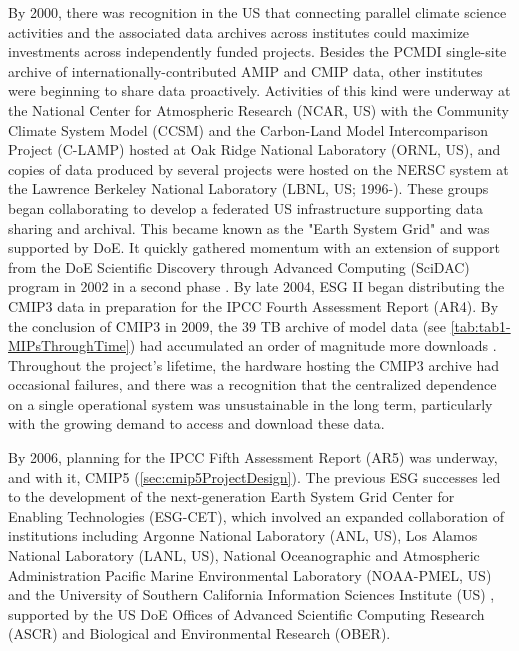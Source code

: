 \documentclass[manuscript]{copernicus}
\begin{document}
By 2000, there was recognition in the US that connecting parallel climate science activities and the associated data archives across institutes could maximize investments across independently funded projects. Besides the PCMDI single-site archive of internationally-contributed AMIP and CMIP data, other institutes were beginning to share data proactively. Activities of this kind were underway at the National Center for Atmospheric Research (NCAR, US) with the Community Climate System Model (CCSM) and the Carbon-Land Model Intercomparison Project (C-LAMP) hosted at Oak Ridge National Laboratory (ORNL, US), and copies of data produced by several projects were hosted on the NERSC system at the Lawrence Berkeley National Laboratory (LBNL, US; 1996-). These groups began collaborating to develop a federated US infrastructure supporting data sharing and archival. This became known as the "Earth System Grid" \citep[ESG I;][]{bernholdt_earth_2007} and was supported by DoE. It quickly gathered momentum with an extension of support from the DoE Scientific Discovery through Advanced Computing (SciDAC) program in 2002 in a second phase \citep[ESG II;][]{williams_earth_2009}. By late 2004, ESG II began distributing the CMIP3 data in preparation for the IPCC Fourth Assessment Report (AR4). By the conclusion of CMIP3 in 2009, the 39 TB archive of model data (see \autoref{tab:tab1-MIPsThroughTime}) had accumulated an order of magnitude more downloads \citep[470 TB;][]{ananthakrishnan_building_2007, williams_earth_2009}. Throughout the project's lifetime, the hardware hosting the CMIP3 archive had occasional failures, and there was a recognition that the centralized dependence on a single operational system was unsustainable in the long term, particularly with the growing demand to access and download these data.

By 2006, planning for the IPCC Fifth Assessment Report (AR5) was underway, and with it, CMIP5 (\autoref{sec:cmip5ProjectDesign}). The previous ESG successes led to the development of the next-generation Earth System Grid Center for Enabling Technologies (ESG-CET), which involved an expanded collaboration of institutions including Argonne National Laboratory (ANL, US), Los Alamos National Laboratory (LANL, US), National Oceanographic and Atmospheric Administration Pacific Marine Environmental Laboratory (NOAA-PMEL, US) and the University of Southern California Information Sciences Institute (US) \citep{ananthakrishnan_building_2007}, supported by the US DoE Offices of Advanced Scientific Computing Research (ASCR) and Biological and Environmental Research (OBER).
\end{document}
